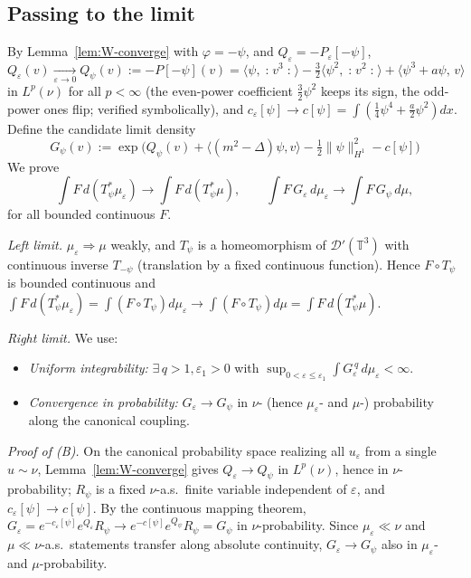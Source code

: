 \documentclass[12pt]{article}
\newcommand{\bT}{\mathbb{T}}
\newcommand{\cD}{\mathcal{D}}
\newcommand{\eps}{\varepsilon}
\newcommand{\Wick}[1]{\mathopen{:}#1\mathclose{:}}
\theoremstyle{plain}
\theoremstyle{definition}
\begin{document}
\subsection{Passing to the limit}
By Lemma~\ref{lem:W-converge} with $\varphi=-\psi$, and $Q_\eps=-P_\eps[-\psi]$,
\begin{equation}\label{eq:Qlim}
Q_\eps(v)\xrightarrow[\eps\to0]{}Q_\psi(v):=-P[-\psi](v)
=\langle\psi,\Wick{v^3}\rangle-\tfrac32\langle\psi^2,\Wick{v^2}\rangle
+\langle\psi^3+a\psi,\,v\rangle
\end{equation}
in $L^p(\nu)$ for all $p<\infty$ (the even-power coefficient $\tfrac32\psi^2$ keeps
its sign, the odd-power ones flip; verified symbolically), and $c_\eps[\psi]\to
c[\psi]=\int(\tfrac14\psi^4+\tfrac a2\psi^2)dx$. Define the candidate limit density
\begin{equation}\label{eq:RN-final}
\boxed{\;G_\psi(v):=\exp\Big(Q_\psi(v)+\langle(m^2-\Delta)\psi,v\rangle
-\tfrac12\|\psi\|_{H^1}^2-c[\psi]\Big)\;}
\end{equation}
We prove
\begin{equation}\label{eq:two-limits}
\int F\,d(T_\psi^*\mu_\eps)\to\int F\,d(T_\psi^*\mu),\qquad
\int F\,G_\eps\,d\mu_\eps\to\int F\,G_\psi\,d\mu,
\end{equation}
for all bounded continuous $F$.

\emph{Left limit.} $\mu_\eps\Rightarrow\mu$ weakly, and $T_\psi$ is a homeomorphism
of $\cD'(\bT^3)$ with continuous inverse $T_{-\psi}$ (translation by a fixed
continuous function). Hence $F\circ T_\psi$ is bounded continuous and
$\int F\,d(T_\psi^*\mu_\eps)=\int (F\circ T_\psi)d\mu_\eps\to\int(F\circ T_\psi)d\mu
=\int F\,d(T_\psi^*\mu)$.

\emph{Right limit.} We use:
\begin{itemize}
\item[(A)] \emph{Uniform integrability:} $\exists\,q>1,\eps_1>0$ with
$\sup_{0<\eps\le\eps_1}\int G_\eps^{\,q}\,d\mu_\eps<\infty$.
\item[(B)] \emph{Convergence in probability:} $G_\eps\to G_\psi$ in $\nu$- (hence
$\mu_\eps$- and $\mu$-) probability along the canonical coupling.
\end{itemize}

\emph{Proof of (B).} On the canonical probability space realizing all $u_\eps$ from
a single $u\sim\nu$, Lemma~\ref{lem:W-converge} gives $Q_\eps\to Q_\psi$ in
$L^p(\nu)$, hence in $\nu$-probability; $R_\psi$ is a fixed $\nu$-a.s.\ finite
variable independent of $\eps$, and $c_\eps[\psi]\to c[\psi]$. By the continuous
mapping theorem, $G_\eps=e^{-c_\eps[\psi]}e^{Q_\eps}R_\psi\to e^{-c[\psi]}e^{Q_\psi}R_\psi
=G_\psi$ in $\nu$-probability. Since $\mu_\eps\ll\nu$ and $\mu\ll\nu$-a.s.\
statements transfer along absolute continuity, $G_\eps\to G_\psi$ also in
$\mu_\eps$- and $\mu$-probability.
\end{document}
